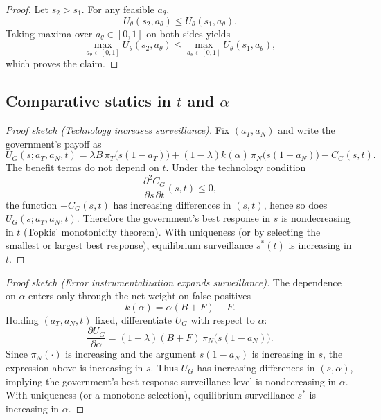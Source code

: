 \documentclass[11pt,a4paper]{article}
\theoremstyle{definition}
\theoremstyle{remark}
\theoremstyle{definition}
\begin{document}
\begin{proof}
Let $s_2>s_1$. For any feasible $a_\theta$,
$$
U_\theta(s_2,a_\theta)\le U_\theta(s_1,a_\theta).
$$
Taking maxima over $a_\theta\in[0,1]$ on both sides yields
$$
\max_{a_\theta\in[0,1]}U_\theta(s_2,a_\theta)
\le
\max_{a_\theta\in[0,1]}U_\theta(s_1,a_\theta),
$$
which proves the claim.
\end{proof}

\subsection{Comparative statics in $t$ and $\alpha$}

\begin{proof}[Proof sketch (Technology increases surveillance)]
Fix $(a_T,a_N)$ and write the government's payoff as
$$
U_G(s;a_T,a_N,t)
=
\lambda B\,\pi_T\!\bigl(s(1-a_T)\bigr)
+
(1-\lambda)k(\alpha)\,\pi_N\!\bigl(s(1-a_N)\bigr)
-
C_G(s,t).
$$
The benefit terms do not depend on $t$. Under the technology condition
$$
\frac{\partial^2 C_G}{\partial s\,\partial t}(s,t)\le 0,
$$
the function $-C_G(s,t)$ has increasing differences in $(s,t)$, hence so does $U_G(s;a_T,a_N,t)$. Therefore the government's best response in $s$ is nondecreasing in $t$ (Topkis' monotonicity theorem). With uniqueness (or by selecting the smallest or largest best response), equilibrium surveillance $s^*(t)$ is increasing in $t$.
\end{proof}

\begin{proof}[Proof sketch (Error instrumentalization expands surveillance)]
The dependence on $\alpha$ enters only through the net weight on false positives
$$
k(\alpha)=\alpha(B+F)-F.
$$
Holding $(a_T,a_N,t)$ fixed, differentiate $U_G$ with respect to $\alpha$:
$$
\frac{\partial U_G}{\partial \alpha}
=
(1-\lambda)(B+F)\,\pi_N\!\bigl(s(1-a_N)\bigr).
$$
Since $\pi_N(\cdot)$ is increasing and the argument $s(1-a_N)$ is increasing in $s$, the expression above is increasing in $s$. Thus $U_G$ has increasing differences in $(s,\alpha)$, implying the government's best-response surveillance level is nondecreasing in $\alpha$. With uniqueness (or a monotone selection), equilibrium surveillance $s^*$ is increasing in $\alpha$.
\end{proof}
\end{document}

